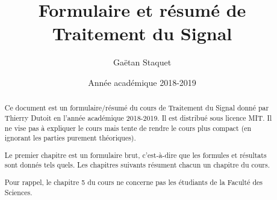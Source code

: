 \documentclass[a4paper, titlepage, twoside, openright, french]{report}
\title{Formulaire et résumé de Traitement du Signal}
\date{Année académique 2018-2019}
\author{Gaëtan Staquet}
\begin{document}
    \maketitle

    \begin{abstract}
        Ce document est un formulaire/résumé du cours de Traitement du Signal donné par Thierry Dutoit en l'année académique 2018-2019. Il est distribué sous licence MIT. Il ne vise pas à expliquer le cours mais tente de rendre le cours plus compact (en ignorant les parties purement théoriques).

        Le premier chapitre est un formulaire brut, c'est-à-dire que les formules et résultats sont donnés tels quels. Les chapitres suivants résument chacun un chapitre du cours.

        Pour rappel, le chapitre 5 du cours ne concerne pas les étudiants de la Faculté des Sciences.
    \end{abstract}

    \newpage
    \thispagestyle{fancy}
    \tableofcontents

    \newpage
    
    
    
    
    
    

    \cleardoublepage
    \printindex
    \cleardoublepage
    \printnomenclature
\end{document}
